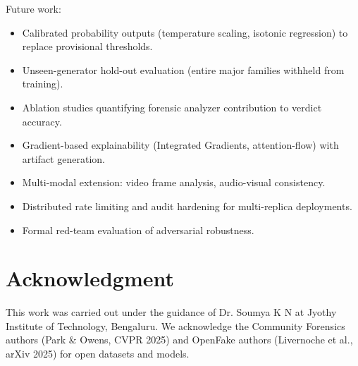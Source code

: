 \documentclass[10pt,conference,compsoc]{IEEEtran}
\begin{document}
Future work:
\begin{itemize}
  \item Calibrated probability outputs (temperature scaling, isotonic regression) to replace provisional thresholds.
  \item Unseen-generator hold-out evaluation (entire major families withheld from training).
  \item Ablation studies quantifying forensic analyzer contribution to verdict accuracy.
  \item Gradient-based explainability (Integrated Gradients, attention-flow) with artifact generation.
  \item Multi-modal extension: video frame analysis, audio-visual consistency.
  \item Distributed rate limiting and audit hardening for multi-replica deployments.
  \item Formal red-team evaluation of adversarial robustness.
\end{itemize}

\section*{Acknowledgment}
This work was carried out under the guidance of Dr. Soumya K N at Jyothy Institute of Technology, Bengaluru.
We acknowledge the Community Forensics authors (Park \& Owens, CVPR 2025) and OpenFake authors (Livernoche et al., arXiv 2025) for open datasets and models.



\end{document}
